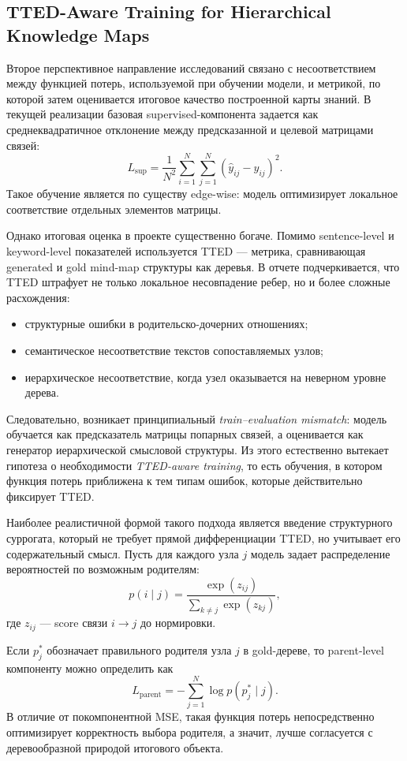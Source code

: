 \subsection{TTED-Aware Training for Hierarchical Knowledge Maps}

Второе перспективное направление исследований связано с несоответствием между функцией потерь, используемой при обучении модели, и метрикой, по которой затем оценивается итоговое качество построенной карты знаний. В текущей реализации базовая supervised-компонента задается как среднеквадратичное отклонение между предсказанной и целевой матрицами связей:
\[
L_{\mathrm{sup}}
=
\frac{1}{N^2}
\sum_{i=1}^{N}\sum_{j=1}^{N}
(\hat{y}_{ij} - y_{ij})^2.
\]
Такое обучение является по существу edge-wise: модель оптимизирует локальное соответствие отдельных элементов матрицы.

Однако итоговая оценка в проекте существенно богаче. Помимо sentence-level и keyword-level показателей используется TTED --- метрика, сравнивающая generated и gold mind-map структуры как деревья. В отчете подчеркивается, что TTED штрафует не только локальное несовпадение ребер, но и более сложные расхождения:
\begin{itemize}
    \item структурные ошибки в родительско-дочерних отношениях;
    \item семантическое несоответствие текстов сопоставляемых узлов;
    \item иерархическое несоответствие, когда узел оказывается на неверном уровне дерева.
\end{itemize}

Следовательно, возникает принципиальный \emph{train--evaluation mismatch}: модель обучается как предсказатель матрицы попарных связей, а оценивается как генератор иерархической смысловой структуры. Из этого естественно вытекает гипотеза о необходимости \emph{TTED-aware training}, то есть обучения, в котором функция потерь приближена к тем типам ошибок, которые действительно фиксирует TTED.

Наиболее реалистичной формой такого подхода является введение структурного суррогата, который не требует прямой дифференциации TTED, но учитывает его содержательный смысл. Пусть для каждого узла $j$ модель задает распределение вероятностей по возможным родителям:
\[
p(i \mid j)
=
\frac{\exp(z_{ij})}{\sum_{k \ne j}\exp(z_{kj})},
\]
где $z_{ij}$ --- score связи $i \rightarrow j$ до нормировки.

Если $p_j^\ast$ обозначает правильного родителя узла $j$ в gold-дереве, то parent-level компоненту можно определить как
\[
L_{\mathrm{parent}}
=
-\sum_{j=1}^{N}
\log p(p_j^\ast \mid j).
\]
В отличие от покомпонентной MSE, такая функция потерь непосредственно оптимизирует корректность выбора родителя, а значит, лучше согласуется с деревообразной природой итогового объекта.

